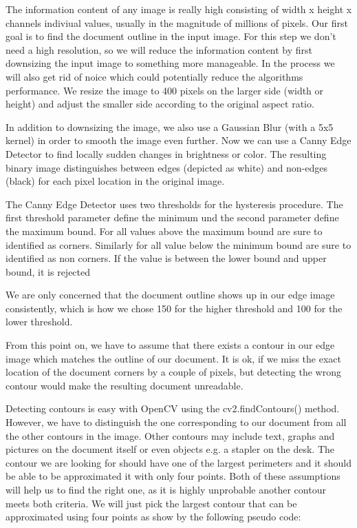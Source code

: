 \documentclass[bibliography=totoc]{scrartcl}
\begin{document}
	The information content of any image is really high consisting of width x height x channels indiviual values, usually in the magnitude of millions of pixels.
	Our first goal is to find the document outline in the input image.
	For this step we don't need a high resolution, so we will reduce the information content by first downsizing the input image to something more manageable.
	In the process we will also get rid of noice which could potentially reduce the algorithms performance.
	We resize the image to 400 pixels on the larger side (width or height) and adjust the smaller side according to the original aspect ratio.
	
	In addition to downsizing the image, we also use a Gaussian Blur (with a 5x5 kernel) in order to smooth the image even further.
	Now we can use a Canny Edge Detector to find locally sudden changes in brightness or color. 
	The resulting binary image distinguishes between edges (depicted as white) and non-edges (black) for each pixel location in the original image.
	
	The Canny Edge Detector uses two thresholds for the hysteresis procedure. 
	The first threshold parameter define the minimum und the second parameter define the maximum bound.
	For all values above the maximum bound are sure to identified as corners. 
	Similarly for all value below the minimum bound are sure to identified as non corners. 
	If the value is between the lower bound and upper bound, it is rejected
	
	We are only concerned that the document outline shows up in our edge image consistently, which is how we chose 150 for the higher threshold and 100 for the lower threshold.
	
	From this point on, we have to assume that there exists a contour in our edge image which matches the outline of our document. 
	It is ok, if we miss the exact location of the document corners by a couple of pixels, but detecting the wrong contour would make the resulting document unreadable.

	Detecting contours is easy with OpenCV using the cv2.findContours() method.
	However, we have to distinguish the one corresponding to our document from all the other contours in the image.
	Other contours may include text, graphs and pictures on the document itself or even objects e.g. a stapler on the desk. 
	The contour we are looking for should have one of the largest perimeters and it should be able to be approximated it with only four points.
	Both of these assumptions will help us to find the right one, as it is highly unprobable another contour meets both criteria. 
	We will just pick the largest contour that can be approximated using four points as show by the following pseudo code:
	
\end{document}
